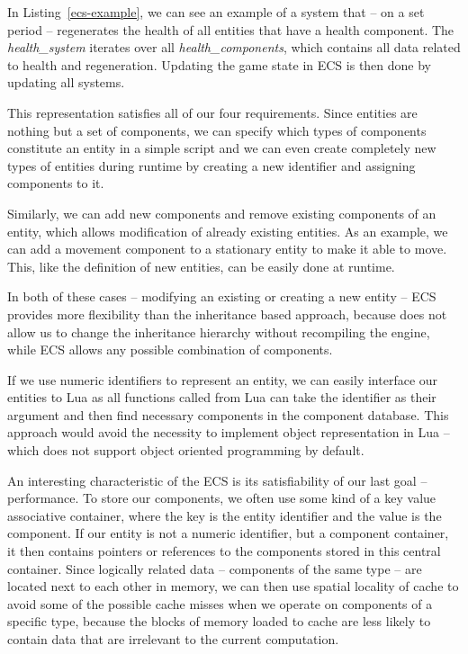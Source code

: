 In Listing~\ref{ecs-example}, we can see an example of a system that -- on a set period -- regenerates the health of all entities
that have a health component. The \emph{health\_system} iterates over all \emph{health\_components}, which contains all
data related to health and regeneration. Updating the game state in ECS is then done by updating all systems.

This representation satisfies all of our four requirements. Since entities are nothing but a set of components, we can specify
which types of components constitute an entity in a simple script and we can even create completely new types of entities
during runtime by creating a new identifier and assigning components to it.

Similarly, we can add new components and remove existing components of an entity, which allows modification of already existing
entities. As an example, we can add a movement component to a stationary entity to make it able to move. This, like the definition
of new entities, can be easily done at runtime.

In both of these cases -- modifying an existing or creating a new entity -- ECS provides more flexibility than the inheritance
based approach, because \cpp does not allow us to change the inheritance hierarchy without recompiling the engine, while
ECS allows any possible combination of components.

If we use numeric identifiers to represent an entity, we can easily interface our entities to Lua as all \cpp functions
called from Lua can take the identifier as their argument and then find necessary components in the component database.
This approach would avoid the necessity to implement object representation in Lua -- which does not support object oriented
programming by default.

An interesting characteristic of the ECS is its satisfiability of our last goal -- performance. To store our components,
we often use some kind of a key value associative container, where the key is the entity identifier and the value is the component.
If our entity is not a numeric identifier, but a component container, it then contains pointers or references to the components
stored in this central container. Since logically related data -- components of the same type -- are located next to each other
in memory, we can then use spatial locality of cache to avoid some of the possible cache misses when we operate on components of a specific
type, because the blocks of memory loaded to cache are less likely to contain data that are irrelevant to the current computation.

